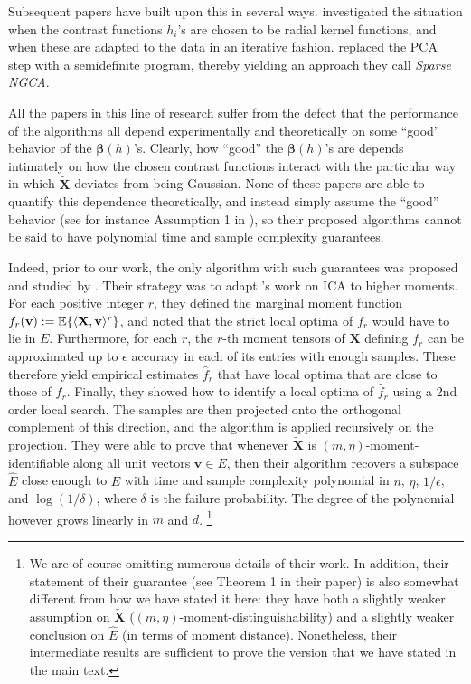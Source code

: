 \documentclass[final,12pt]{colt2018} %
\numberwithin{equation}{section}
\DeclarePairedDelimiter{\braces}{\lbrace}{\rbrace}
\DeclarePairedDelimiter{\inprod}{\langle}{\rangle}
\newcommand{\E}{\mathbb{E}}
\newcommand{\boldv}{\textbf{v}}
\newcommand{\boldX}{\textbf{X}}
\begin{document}
Subsequent papers have built upon this in several ways. \cite{Kawanabe2006} investigated the situation when the contrast functions $h_i$'s are chosen to be radial kernel functions, and when these are adapted to the data in an iterative fashion. \cite{Diederichs2010b,Diederichs2013b} replaced the PCA step with a semidefinite program, thereby yielding an approach they call \textit{Sparse NGCA}.

All the papers in this line of research suffer from the defect that the performance of the algorithms all depend experimentally and theoretically on some ``good'' behavior of the $\boldsymbol{\beta}(h)$'s. Clearly, how ``good'' the $\boldsymbol{\beta}(h)$'s are depends intimately on how the chosen contrast functions interact with the particular way in which $\tilde{\boldX}$ deviates from being Gaussian. None of these papers are able to quantify this dependence theoretically, and instead simply assume the ``good'' behavior (see for instance Assumption 1 in \cite{Diederichs2013b}), so their proposed algorithms cannot be said to have polynomial time and sample complexity guarantees.

Indeed, prior to our work, the only algorithm with such guarantees was proposed and studied by \cite{Vempala2011}. Their strategy was to adapt \cite{Frieze1996}'s work on ICA to higher moments. For each positive integer $r$, they defined the marginal moment function $f_r(\boldv) := \E\braces{\inprod{\boldX,\boldv}^r}$, and noted that the strict local optima of $f_r$ would have to lie in $E$. Furthermore, for each $r$, the $r$-th moment tensors of $\boldX$ defining $f_r$ can be approximated up to $\epsilon$ accuracy in each of its entries with enough samples. These therefore yield empirical estimates $\hat{f}_r$ that have local optima that are close to those of $f_r$. Finally, they showed how to identify a local optima of $\hat{f}_r$ using a 2nd order local search. The samples are then projected onto the orthogonal complement of this direction, and the algorithm is applied recursively on the projection. They were able to prove that whenever $\tilde{\boldX}$ is $(m,\eta)$-moment-identifiable along all unit vectors $\boldv \in E$, then their algorithm recovers a subspace $\hat{E}$ close enough to $E$ with time and sample complexity polynomial in $n$, $\eta$, $1/\epsilon$, and $\log(1/\delta)$, where $\delta$ is the failure probability. The degree of the polynomial however grows linearly in $m$ and $d$.
\footnote{We are of course omitting numerous details of their work. In addition, their statement of their guarantee (see Theorem 1 in their paper) is also somewhat different from how we have stated it here: they have both a slightly weaker assumption on $\tilde{\boldX}$ ($(m,\eta)$-moment-distinguishability) and a slightly weaker conclusion on $\hat{E}$ (in terms of moment distance). Nonetheless, their intermediate results are sufficient to prove the version that we have stated in the main text.}
\end{document}
